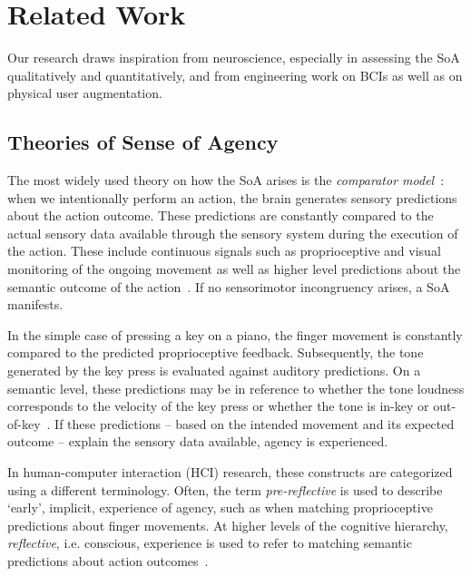 \section{Related Work}
Our research draws inspiration from neuroscience, especially in assessing the SoA qualitatively and quantitatively, and from engineering work on BCIs as well as on physical user augmentation.

\subsection{Theories of Sense of Agency}
The most widely used theory on how the SoA arises is the \textit{comparator model}~\cite{Blakemore2002-dj, Frith2000-ch, Frith2006-sc}: when we intentionally perform an action, the brain generates sensory predictions about the action outcome. These predictions are constantly compared to the actual sensory data available through the sensory system during the execution of the action. These include continuous signals such as proprioceptive and visual monitoring of the ongoing movement as well as higher level predictions about the semantic outcome of the action~\cite{Clark2013-ah, Haggard2003-ff, Haggard2017-uv}. If no sensorimotor incongruency arises, a SoA manifests. 

In the simple case of pressing a key on a piano, the finger movement is constantly compared to the predicted proprioceptive feedback. Subsequently, the tone generated by the key press is evaluated against auditory predictions. On a semantic level, these predictions may be in reference to whether the tone loudness corresponds to the velocity of the key press or whether the tone is in-key or out-of-key~\cite{Pangratz2023-ew}. If these predictions -- based on the intended movement and its expected outcome -- explain the sensory data available, agency is experienced.

In human-computer interaction (HCI) research, these constructs are categorized using a different terminology. Often, the term \textit{pre-reflective} is used to describe `early', implicit, experience of agency, such as when matching proprioceptive predictions about finger movements. At higher levels of the cognitive hierarchy, \textit{reflective}, i.e. conscious, experience is used to refer to matching semantic predictions about action outcomes~\cite{Danry2022-xk, Cornelio2022-aq}. 

